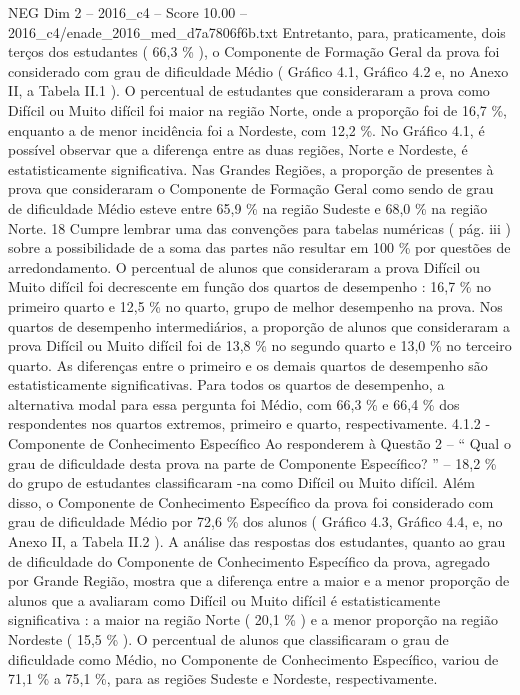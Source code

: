 \begin{textsample}{NEG Dim 2 – 2016\_c4 – Score 10.00 – 2016\_c4/enade\_2016\_med\_d7a7806f6b.txt}
Entretanto, para, praticamente, dois terços dos estudantes ( 66,3 \% ), o Componente de Formação Geral da prova foi considerado com grau de dificuldade Médio ( Gráfico 4.1, Gráfico 4.2 e, no Anexo II, a Tabela II.1 ).
O percentual de estudantes que consideraram a prova como Difícil ou Muito difícil foi maior na região Norte, onde a proporção foi de 16,7 \%, enquanto a de menor incidência foi a Nordeste, com 12,2 \%.
No Gráfico 4.1, é possível observar que a diferença entre as duas regiões, Norte e Nordeste, é estatisticamente significativa.
Nas Grandes Regiões, a proporção de presentes à prova que consideraram o Componente de Formação Geral como sendo de grau de dificuldade Médio esteve entre 65,9 \% na região Sudeste e 68,0 \% na região Norte. 18 Cumpre lembrar uma das convenções para tabelas numéricas ( pág. iii ) sobre a possibilidade de a soma das partes não resultar em 100 \% por questões de arredondamento.
O percentual de alunos que consideraram a prova Difícil ou Muito difícil foi decrescente em função dos quartos de desempenho : 16,7 \% no primeiro quarto e 12,5 \% no quarto, grupo de melhor desempenho na prova.
Nos quartos de desempenho intermediários, a proporção de alunos que consideraram a prova Difícil ou Muito difícil foi de 13,8 \% no segundo quarto e 13,0 \% no terceiro quarto.
As diferenças entre o primeiro e os demais quartos de desempenho são estatisticamente significativas.
Para todos os quartos de desempenho, a alternativa modal para essa pergunta foi Médio, com 66,3 \% e 66,4 \% dos respondentes nos quartos extremos, primeiro e quarto, respectivamente. 4.1.2 - Componente de Conhecimento Específico Ao responderem à Questão 2 – “ Qual o grau de dificuldade desta prova na parte de Componente Específico? ” – 18,2 \% do grupo de estudantes classificaram -na como Difícil ou Muito difícil.
Além disso, o Componente de Conhecimento Específico da prova foi considerado com grau de dificuldade Médio por 72,6 \% dos alunos ( Gráfico 4.3, Gráfico 4.4, e, no Anexo II, a Tabela II.2 ).
A análise das respostas dos estudantes, quanto ao grau de dificuldade do Componente de Conhecimento Específico da prova, agregado por Grande Região, mostra que a diferença entre a maior e a menor proporção de alunos que a avaliaram como Difícil ou Muito difícil é estatisticamente significativa : a maior na região Norte ( 20,1 \% ) e a menor proporção na região Nordeste ( 15,5 \% ).
O percentual de alunos que classificaram o grau de dificuldade como Médio, no Componente de Conhecimento Específico, variou de 71,1 \% a 75,1 \%, para as regiões Sudeste e Nordeste, respectivamente.

\end{textsample}
